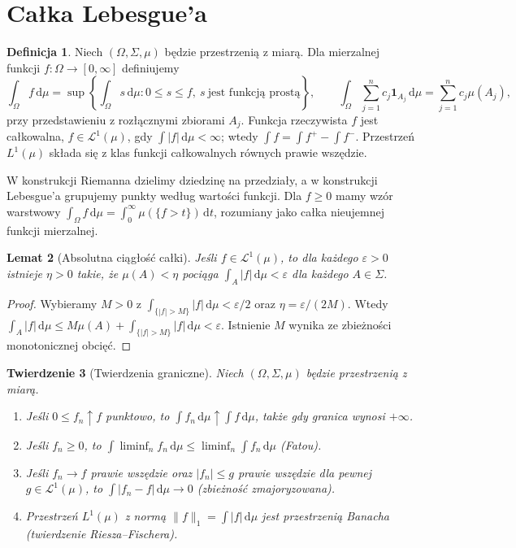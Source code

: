 \documentclass[11pt,a4paper]{article}
\numberwithin{equation}{section}
\theoremstyle{plain}
\newtheorem{twierdzenie}{Twierdzenie}[section]
\newtheorem{lemat}[twierdzenie]{Lemat}
\theoremstyle{definition}
\newtheorem{definicja}[twierdzenie]{Definicja}
\theoremstyle{remark}
\newcommand{\ind}[1]{\mathbf 1_{#1}}
\begin{document}
\section{Całka Lebesgue'a}
\begin{definicja}
Niech $(\Omega,\Sigma,\mu)$ będzie przestrzenią z miarą. Dla mierzalnej funkcji $f:\Omega\to[0,\infty]$ definiujemy
\[
\int_\Omega f\,\mathrm d\mu=\sup\left\{\int_\Omega s\,\mathrm d\mu:0\le s\le f,\ s\ \text{jest funkcją prostą}\right\},\qquad
\int_\Omega\sum_{j=1}^n c_j\ind{A_j}\,\mathrm d\mu=\sum_{j=1}^n c_j\mu(A_j),
\]
przy przedstawieniu z rozłącznymi zbiorami $A_j$. Funkcja rzeczywista $f$ jest całkowalna, $f\in\mathcal L^1(\mu)$, gdy $\int|f|\,\mathrm d\mu<\infty$; wtedy $\int f=\int f^+-\int f^-$. Przestrzeń $L^1(\mu)$ składa się z klas funkcji całkowalnych równych prawie wszędzie.
\end{definicja}
W konstrukcji Riemanna dzielimy dziedzinę na przedziały, a w konstrukcji Lebesgue'a grupujemy punkty według wartości funkcji. Dla $f\ge0$ mamy wzór warstwowy $\int_\Omega f\,\mathrm d\mu=\int_0^\infty\mu(\{f>t\})\,\mathrm dt$, rozumiany jako całka nieujemnej funkcji mierzalnej.
\begin{lemat}[Absolutna ciągłość całki]
Jeśli $f\in\mathcal L^1(\mu)$, to dla każdego $\varepsilon>0$ istnieje $\eta>0$ takie, że $\mu(A)<\eta$ pociąga $\int_A|f|\,\mathrm d\mu<\varepsilon$ dla każdego $A\in\Sigma$.
\end{lemat}
\begin{proof}
Wybieramy $M>0$ z $\int_{\{|f|>M\}}|f|\,\mathrm d\mu<\varepsilon/2$ oraz $\eta=\varepsilon/(2M)$. Wtedy $\int_A|f|\,\mathrm d\mu\le M\mu(A)+\int_{\{|f|>M\}}|f|\,\mathrm d\mu<\varepsilon$. Istnienie $M$ wynika ze zbieżności monotonicznej obcięć.
\end{proof}
\begin{twierdzenie}[Twierdzenia graniczne]
Niech $(\Omega,\Sigma,\mu)$ będzie przestrzenią z miarą.
\begin{enumerate}[label=(\alph*)]
\item Jeśli $0\le f_n\uparrow f$ punktowo, to $\int f_n\,\mathrm d\mu\uparrow\int f\,\mathrm d\mu$, także gdy granica wynosi $+\infty$.
\item Jeśli $f_n\ge0$, to $\int\liminf_n f_n\,\mathrm d\mu\le\liminf_n\int f_n\,\mathrm d\mu$ (Fatou).
\item Jeśli $f_n\to f$ prawie wszędzie oraz $|f_n|\le g$ prawie wszędzie dla pewnej $g\in\mathcal L^1(\mu)$, to $\int|f_n-f|\,\mathrm d\mu\to0$ (zbieżność zmajoryzowana).
\item Przestrzeń $L^1(\mu)$ z normą $\|f\|_1=\int|f|\,\mathrm d\mu$ jest przestrzenią Banacha (twierdzenie Riesza--Fischera).
\end{enumerate}
\end{twierdzenie}
\end{document}
